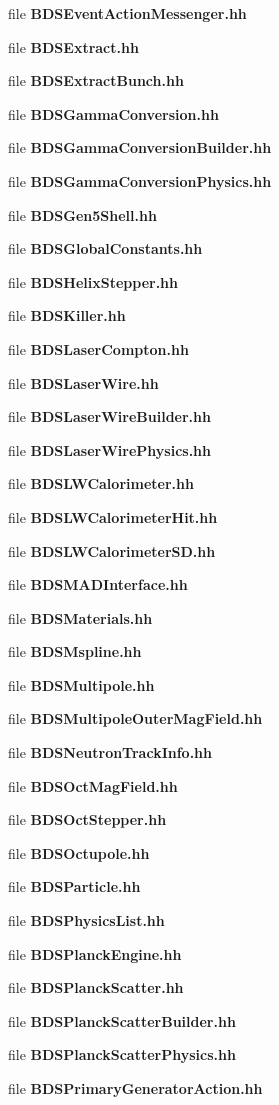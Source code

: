 \begin{CompactItemize}
\item 
file {\bf BDSEventActionMessenger.hh}
\item 
file {\bf BDSExtract.hh}
\item 
file {\bf BDSExtractBunch.hh}
\item 
file {\bf BDSGammaConversion.hh}
\item 
file {\bf BDSGammaConversionBuilder.hh}
\item 
file {\bf BDSGammaConversionPhysics.hh}
\item 
file {\bf BDSGen5Shell.hh}
\item 
file {\bf BDSGlobalConstants.hh}
\item 
file {\bf BDSHelixStepper.hh}
\item 
file {\bf BDSKiller.hh}
\item 
file {\bf BDSLaserCompton.hh}
\item 
file {\bf BDSLaserWire.hh}
\item 
file {\bf BDSLaserWireBuilder.hh}
\item 
file {\bf BDSLaserWirePhysics.hh}
\item 
file {\bf BDSLWCalorimeter.hh}
\item 
file {\bf BDSLWCalorimeterHit.hh}
\item 
file {\bf BDSLWCalorimeterSD.hh}
\item 
file {\bf BDSMADInterface.hh}
\item 
file {\bf BDSMaterials.hh}
\item 
file {\bf BDSMspline.hh}
\item 
file {\bf BDSMultipole.hh}
\item 
file {\bf BDSMultipoleOuterMagField.hh}
\item 
file {\bf BDSNeutronTrackInfo.hh}
\item 
file {\bf BDSOctMagField.hh}
\item 
file {\bf BDSOctStepper.hh}
\item 
file {\bf BDSOctupole.hh}
\item 
file {\bf BDSParticle.hh}
\item 
file {\bf BDSPhysicsList.hh}
\item 
file {\bf BDSPlanckEngine.hh}
\item 
file {\bf BDSPlanckScatter.hh}
\item 
file {\bf BDSPlanckScatterBuilder.hh}
\item 
file {\bf BDSPlanckScatterPhysics.hh}
\item 
file {\bf BDSPrimaryGeneratorAction.hh}
\item 

\end{CompactItemize}
